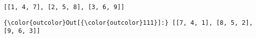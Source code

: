 \documentclass[11pt]{article}
\begin{document}
    \begin{Verbatim}[commandchars=\\\{\}]
[[1, 4, 7], [2, 5, 8], [3, 6, 9]]

    \end{Verbatim}

\begin{Verbatim}[commandchars=\\\{\}]
{\color{outcolor}Out[{\color{outcolor}111}]:} [[7, 4, 1], [8, 5, 2], [9, 6, 3]]
\end{Verbatim}
            

    
    
    
    
\end{document}
